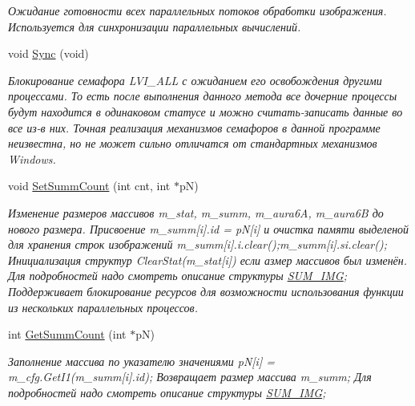 \begin{DoxyCompactItemize}
\begin{DoxyCompactList}\small\item\em Ожидание готовности всех параллельных потоков обработки изображения. Используется для синхронизации параллельных вычислений. \end{DoxyCompactList}\item 
void \hyperlink{class_c_v_i_engine_base_af12866653055639e69a61224615af7fe}{Sync} (void)
\begin{DoxyCompactList}\small\item\em Блокирование семафора L\+V\+I\+\_\+\+A\+L\+L с ожиданием его освобождения другими процессами. То есть после выполнения данного метода все дочерние процессы будут находится в одинаковом статусе и можно считать-\/записать данные во все из-\/в них. Точная реализация механизмов семафоров в данной программе неизвестна, но не может сильно отличатся от стандартных механизмов Windows. \end{DoxyCompactList}\item 
void \hyperlink{class_c_v_i_engine_base_a4b6c77fcb50dcb01f299d7e0f4b05ea6}{Set\+Summ\+Count} (int cnt, int $\ast$p\+N)
\begin{DoxyCompactList}\small\item\em Изменение размеров массивов m\+\_\+stat, m\+\_\+summ, m\+\_\+aura6\+A, m\+\_\+aura6\+B до нового размера. Присвоение m\+\_\+summ\mbox{[}i\mbox{]}.id = p\+N\mbox{[}i\mbox{]} и очистка памяти выделеной для хранения строк изображений m\+\_\+summ\mbox{[}i\mbox{]}.i.\+clear();m\+\_\+summ\mbox{[}i\mbox{]}.si.\+clear(); Инициализация структур Clear\+Stat(m\+\_\+stat\mbox{[}i\mbox{]}) если азмер массивов был изменён. Для подробностей надо смотреть описание структуры \hyperlink{class_s_u_m___i_m_g}{S\+U\+M\+\_\+\+I\+M\+G}; Поддерживает блокирование ресурсов для возможности использования функции из нескольких параллельных процессов. \end{DoxyCompactList}\item 
int \hyperlink{class_c_v_i_engine_base_adb6193dca9e4f6c71ad6e77df88bc9f7}{Get\+Summ\+Count} (int $\ast$p\+N)
\begin{DoxyCompactList}\small\item\em Заполнение массива по указателю значениями p\+N\mbox{[}i\mbox{]} = m\+\_\+cfg.\+Get\+I1(m\+\_\+summ\mbox{[}i\mbox{]}.id); Возвращает размер массива m\+\_\+summ; Для подробностей надо смотреть описание структуры \hyperlink{class_s_u_m___i_m_g}{S\+U\+M\+\_\+\+I\+M\+G}; \end{DoxyCompactList}\item 

\end{DoxyCompactItemize}
